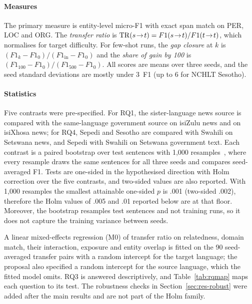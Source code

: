 \paragraph{Measures} The primary measure is entity-level micro-F1 with exact span match on PER, LOC and ORG. The \emph{transfer ratio} is $\mathrm{TR}(s\!\rightarrow\!t)=F1(s\!\rightarrow\!t)/F1(t\!\rightarrow\!t)$, which normalises for target difficulty. For few-shot runs, the \emph{gap closure} at $k$ is $(F1_k-F1_0)/(F1_{\mathrm{in}}-F1_0)$ and the \emph{share of gain by 100} is $(F1_{100}-F1_0)/(F1_{500}-F1_0)$. All scores are means over three seeds, and the seed standard deviations are mostly under 3~F1 (up to 6 for NCHLT Sesotho).

\paragraph{Statistics} Five contrasts were pre-specified. For RQ1, the sister-language news source is compared with the same-language government source on isiZulu news and on isiXhosa news; for RQ4, Sepedi and Sesotho are compared with Swahili on Setswana news, and Sepedi with Swahili on Setswana government text. Each contrast is a paired bootstrap over test sentences with 1,000 resamples~\cite{dror2018}, where every resample draws the same sentences for all three seeds and compares seed-averaged F1. Tests are one-sided in the hypothesised direction with Holm correction over the five contrasts, and two-sided values are also reported. With 1,000 resamples the smallest attainable one-sided $p$ is .001 (two-sided .002), therefore the Holm values of .005 and .01 reported below are at that floor. Moreover, the bootstrap resamples test sentences and not training runs, so it does not capture the training variance between seeds.

A linear mixed-effects regression (M0) of transfer ratio on relatedness, domain match, their interaction, exposure and entity overlap is fitted on the 90 seed-averaged transfer pairs with a random intercept for the target language; the proposal also specified a random intercept for the source language, which the fitted model omits. RQ3 is answered descriptively, and Table~\ref{tab:rqmap} maps each question to its test. The robustness checks in Section~\ref{sec:res-robust} were added after the main results and are not part of the Holm family.

